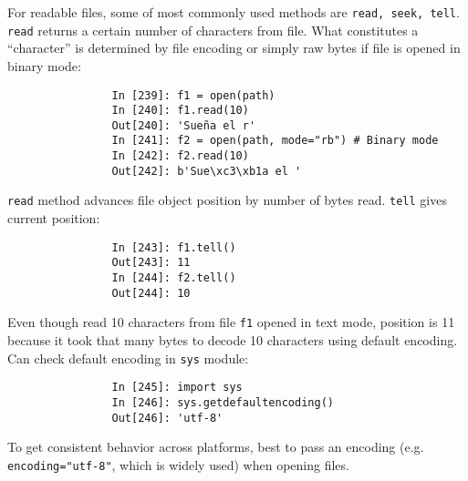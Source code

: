 \documentclass{article}
\begin{document}
\begin{enumerate}
\begin{itemize}
\begin{itemize}
			For readable files, some of most commonly used methods are {\tt read, seek, tell}. {\tt read} returns a certain number of characters from file. What constitutes a ``character'' is determined by file encoding or simply raw bytes if file is opened in binary mode:
			\begin{verbatim}
				In [239]: f1 = open(path)
				In [240]: f1.read(10)
				Out[240]: 'Sueña el r'
				In [241]: f2 = open(path, mode="rb") # Binary mode
				In [242]: f2.read(10)
				Out[242]: b'Sue\xc3\xb1a el '
			\end{verbatim}
			{\tt read} method advances file object position by number of bytes read. {\tt tell} gives current position:
			\begin{verbatim}
				In [243]: f1.tell()
				Out[243]: 11
				In [244]: f2.tell()
				Out[244]: 10
			\end{verbatim}
			Even though read 10 characters from file {\tt f1} opened in text mode, position is 11 because it took that many bytes to decode 10 characters using default encoding. Can check default encoding in {\tt sys} module:
			\begin{verbatim}
				In [245]: import sys
				In [246]: sys.getdefaultencoding()
				Out[246]: 'utf-8'
			\end{verbatim}
			To get consistent behavior across platforms, best to pass an encoding (e.g. {\tt encoding="utf-8"}, which is widely used) when opening files.
			

\end{itemize}
\end{itemize}
\end{enumerate}
\end{document}
